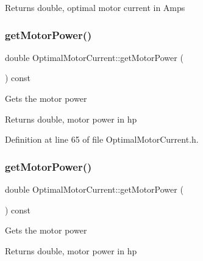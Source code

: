 \begin{DoxyReturn}{Returns}
double, optimal motor current in Amps 
\end{DoxyReturn}
\mbox{\label{class_optimal_motor_current_a345ae983be872a2504c50ff8a96b4fc9}} 
\subsubsection{\texorpdfstring{get\+Motor\+Power()}{getMotorPower()}\hspace{0.1cm}{\footnotesize\ttfamily [1/3]}}
{\footnotesize\ttfamily double Optimal\+Motor\+Current\+::get\+Motor\+Power (\begin{DoxyParamCaption}{ }\end{DoxyParamCaption}) const\hspace{0.3cm}{\ttfamily [inline]}}

Gets the motor power

\begin{DoxyReturn}{Returns}
double, motor power in hp 
\end{DoxyReturn}


Definition at line 65 of file Optimal\+Motor\+Current.\+h.

\mbox{\label{class_optimal_motor_current_a345ae983be872a2504c50ff8a96b4fc9}} 
\subsubsection{\texorpdfstring{get\+Motor\+Power()}{getMotorPower()}\hspace{0.1cm}{\footnotesize\ttfamily [2/3]}}
{\footnotesize\ttfamily double Optimal\+Motor\+Current\+::get\+Motor\+Power (\begin{DoxyParamCaption}{ }\end{DoxyParamCaption}) const\hspace{0.3cm}{\ttfamily [inline]}}

Gets the motor power

\begin{DoxyReturn}{Returns}
double, motor power in hp 
\end{DoxyReturn}


